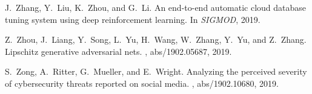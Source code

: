 \documentclass[11pt]{article}
\begin{document}
\begin{thebibliography}{10}
J.~Zhang, Y.~Liu, K.~Zhou, and G.~Li.
\newblock An end-to-end automatic cloud database tuning system using deep
  reinforcement learning.
\newblock In {\em SIGMOD}, 2019.

Z.~Zhou, J.~Liang, Y.~Song, L.~Yu, H.~Wang, W.~Zhang, Y.~Yu, and Z.~Zhang.
\newblock Lipschitz generative adversarial nets.
, abs/1902.05687, 2019.

S.~Zong, A.~Ritter, G.~Mueller, and E.~Wright.
\newblock Analyzing the perceived severity of cybersecurity threats reported on
  social media.
, abs/1902.10680, 2019.

\end{thebibliography}


%
%  


%

%
\end{document}
